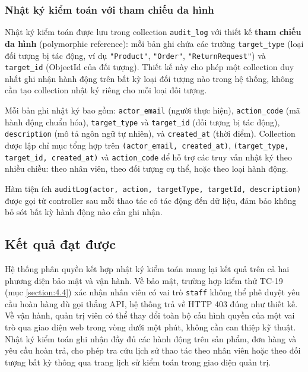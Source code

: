 \documentclass[../DoAn.tex]{subfiles}
\begin{document}
\subsubsection*{Nhật ký kiểm toán với tham chiếu đa hình}

Nhật ký kiểm toán được lưu trong collection \texttt{audit\_log} với thiết kế
\textbf{tham chiếu đa hình} (polymorphic reference): mỗi bản ghi chứa các
trường \break \texttt{target\_type} (loại đối tượng bị tác động, ví dụ
\texttt{"Product"}, \texttt{"Order"}, \break \texttt{"ReturnRequest"}) và
\texttt{target\_id} (ObjectId của đối tượng). Thiết kế này cho phép một
collection duy nhất ghi nhận hành động trên bất kỳ loại đối tượng nào trong
hệ thống, không cần tạo collection nhật ký riêng cho mỗi loại đối tượng.

Mỗi bản ghi nhật ký bao gồm: \texttt{actor\_email} (người thực hiện), \break
\texttt{action\_code} (mã hành động chuẩn hóa), \texttt{target\_type} và
\texttt{target\_id} (đối tượng bị tác động), \texttt{description} (mô tả
ngôn ngữ tự nhiên), và \texttt{created\_at} (thời điểm). Collection được
lập chỉ mục tổng hợp trên \texttt{(actor\_email, created\_at)},
\texttt{(target\_type, target\_id, created\_at)} và \break \texttt{action\_code}
để hỗ trợ các truy vấn nhật ký theo nhiều chiều: theo nhân viên, theo đối
tượng cụ thể, hoặc theo loại hành động.

Hàm tiện ích \texttt{auditLog(actor, action, targetType, \break targetId, description)}
được gọi từ controller sau mỗi thao tác có tác động đến dữ liệu, đảm bảo
không bỏ sót bất kỳ hành động nào cần ghi nhận.

\subsection{Kết quả đạt được}
\label{subsection:5.2.3}

Hệ thống phân quyền kết hợp nhật ký kiểm toán mang lại kết quả trên cả hai
phương diện bảo mật và vận hành. Về bảo mật, trường hợp kiểm thử TC-19
(mục \ref{section:4.4}) xác nhận nhân viên có vai trò \texttt{staff} không
thể phê duyệt yêu cầu hoàn hàng dù gọi thẳng API, hệ thống trả về HTTP 403
đúng như thiết kế. Về vận hành, quản trị viên có thể thay đổi toàn bộ cấu
hình quyền của một vai trò qua giao diện web trong vòng dưới một phút, không
cần can thiệp kỹ thuật. Nhật ký kiểm toán ghi nhận đầy đủ các hành động trên
sản phẩm, đơn hàng và yêu cầu hoàn trả, cho phép tra cứu lịch sử thao tác
theo nhân viên hoặc theo đối tượng bất kỳ thông qua trang lịch sử kiểm toán
trong giao diện quản trị.
\end{document}
